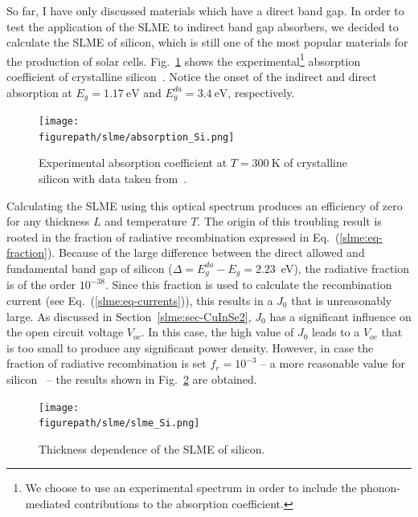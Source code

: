\begin{refsection}
 
So far, I have only discussed materials which have a direct band gap. In 
order to test the application of the \gls{SLME} to indirect band gap absorbers, we 
decided to calculate the \gls{SLME} of silicon, which is still one of the most 
popular materials for the production of solar cells. 
Fig.~\ref{slme:fig-Si_expAbs} shows the experimental\footnote{We choose to 
use an experimental spectrum in order to include the phonon-mediated 
contributions to the absorption coefficient.} absorption coefficient of 
crystalline silicon~\cite{green2008}. Notice the onset of the indirect and 
direct absorption at \mbox{$E_g = 1.17~\si{\electronvolt}$} and 
\mbox{$E_g^{da} = 3.4~\si{\electronvolt}$}, respectively. 

\begin{figure}[ht] 
\centering 
\captionsetup{width=0.9\textwidth}
\texttt{[image: \\figurepath/slme/absorption\_Si.png]} 
\caption{Experimental absorption coefficient at $T = 300~\si{\kelvin}$ of 
crystalline silicon with data taken from~\cite{green2008}.} 
\label{slme:fig-Si_expAbs} 
\end{figure} 

Calculating the \gls{SLME} using this optical spectrum produces an efficiency of 
zero for any thickness $L$ and temperature $T$. The origin of this troubling result is 
rooted in the fraction of radiative recombination expressed in 
Eq.~(\ref{slme:eq-fraction}). Because of the large difference between the 
direct allowed and fundamental band gap of silicon ($\Delta = 
E_g^{da}-E_g=2.23$~\si{\electronvolt}), the radiative fraction is of the order 
$10^{-38}$. Since this fraction is used to calculate the recombination 
current (see Eq.~(\ref{slme:eq-currents})), this results in a $J_0$ that is 
unreasonably large. As discussed in Section~\ref{slme:sec-CuInSe2}, $J_0$ has a 
significant influence on the open circuit voltage $V_{oc}$. In this case, the 
high value of $J_0$ leads to a $V_{oc}$ that is too small to produce any 
significant power density. However, in case the fraction of radiative recombination is set \mbox{$f_r = 10^{-3}$} -- a 
more reasonable value for silicon~\cite{Shockley1952,Trupke2003,Richter2012} -- the results shown in Fig.~\ref{slme:fig-SLME_Si} are obtained. 
 
\begin{figure}[ht] 
	\centering 
		\texttt{[image: \\figurepath/slme/slme\_Si.png]} 
	\caption{Thickness dependence of the \gls{SLME} of silicon.} 
	\label{slme:fig-SLME_Si} 
\end{figure} 
 

\end{refsection}

